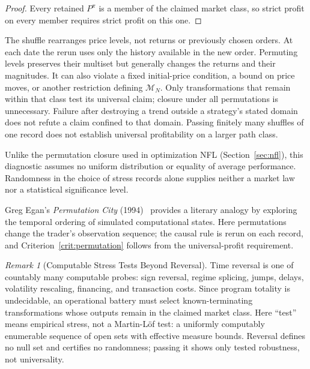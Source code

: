 \documentclass[aps,pra,reprint,superscriptaddress,amsmath,amssymb,floatfix]{revtex4-2}
\theoremstyle{plain}
\theoremstyle{definition}
\theoremstyle{remark}
\newtheorem{remark}{Remark}
\begin{document}
\begin{proof}
Every retained \(P^\pi\) is a member of the claimed market class, so strict
profit on every member requires strict profit on this one.
\end{proof}

The shuffle rearranges price levels, not returns or previously chosen orders.
At each date the rerun uses only the history available in the new order.
Permuting levels preserves their multiset but generally changes the returns
and their magnitudes. It can also violate a fixed initial-price condition,
a bound on price moves, or another restriction defining \(\mathcal M_N\).
Only transformations that remain within that class test its universal claim;
closure under all permutations is unnecessary. Failure after destroying a
trend outside a strategy's stated domain does not refute a claim confined to
that domain. Passing finitely many shuffles of one record does not establish
universal profitability on a larger path class.

Unlike the permutation closure used in optimization NFL
(Section~\ref{sec:nfl}), this diagnostic assumes no uniform distribution or
equality of average performance. Randomness in the choice of stress records
alone supplies neither a market law nor a statistical significance level.

Greg Egan's \emph{Permutation City} (1994)~\cite{permutationcity} provides a
literary analogy by exploring the temporal ordering of simulated computational
states. Here permutations change the trader's observation sequence; the causal
rule is rerun on each record, and Criterion~\ref{crit:permutation} follows from
the universal-profit requirement.

\begin{remark}[Computable Stress Tests Beyond Reversal]
\label{rem:stressfamily}
Time reversal is one of countably many computable probes: sign reversal,
regime splicing, jumps, delays, volatility rescaling, financing, and transaction
costs. Since program totality is undecidable, an operational battery must select
known-terminating transformations whose outputs remain in the claimed market
class. Here ``test'' means empirical stress, not a Martin-L\"of test: a uniformly
computably enumerable sequence of open sets with effective measure bounds.
Reversal defines no null set and certifies no randomness; passing it shows only
tested robustness, not universality.
\end{remark}
\end{document}
